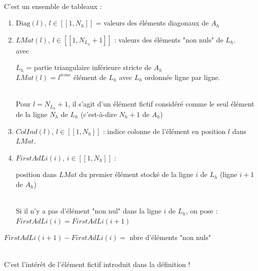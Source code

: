 \documentclass[12pt,a4paper]{article}
\begin{document}
	\begin{defi}$ $\\
		\begin{minipage}{18cm}
			C'est un ensemble de tableaux :
	\begin{enumerate}[label=$\star$]
		\item  $\mathrm{Diag}(l)$, $l\in[\![1,N_h]\!]$ = valeurs des éléments diagonaux de $A_h$
		
		\item $LMat(l)$, $l\in[\![1,N_{L_h}+1]\!]$ : valeurs des éléments "non nuls" de $L_h$.\\
		avec \begin{minipage}[t]{15cm}
			$L_h$ = partie triangulaire inférieure stricte de $A_h$\\
			$LMat(l)$ = $l^{ieme}$ élément de $L_h$ avec $L_h$ ordonnée ligne par ligne.
		\end{minipage}\\
		Pour $l=N_{L_h}+1$, il s'agit d'un élément fictif considéré comme le seul élément de la ligne $N_h$ de $L_h$ (c'est-à-dire $N_h+1$ de $A_h$)
		
		\item $ColInd(l)$, $l\in[\![1,N_h]\!]$ : indice colonne de l'élément en position $l$ dans $LMat$.
		
		\item $FirstAdLi(i)$, $i\in [\![1,N_h]\!]$ : \begin{minipage}[t]{10cm}
			position dans $LMat$ du premier élément stocké de la ligne $i$ de $L_h$ (ligne $i+1$ de $A_h$)
		\end{minipage}\\
		Si il n'y a pas d'élément "non nul" dans la ligne $i$ de $L_h$, on pose : \\
		\hspace*{2.5cm}$FirstAdLi(i) = FirstAdLi(i+1)$
	\end{enumerate}
		\end{minipage}
	\end{defi}
	
	\begin{rmq}
		\begin{minipage}[t]{18cm}
			$FirstAdLi(i+1)-FirstAdLi(i) = $ nbre d'éléments "non nuls"
		\end{minipage}\\
		C'est l'intérêt de l'élément fictif introduit dans la définition !
	\end{rmq}
	
\end{document}

